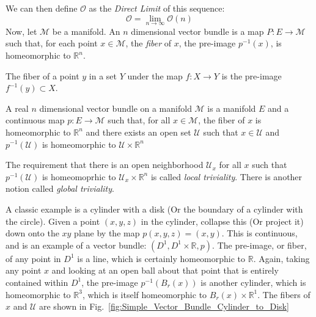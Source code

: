 \documentclass[crop=false,class=book,oneside]{standalone}                      %
\begin{document}
            We can then define $\mathcal{O}$ as the
            \textit{Direct Limit} of this sequence:
            \begin{equation*}
                \mathcal{O}=\underset{n\rightarrow\infty}{\lim}\mathcal{O}(n)
            \end{equation*}
            Now, let $\mathcal{M}$ be a manifold. An $n$ dimensional vector
            bundle is a map $P:E\rightarrow\mathcal{M}$ such that, for each
            point $x\in\mathcal{M}$, the \textit{fiber} of $x$, the pre-image
            $p^{-1}(x)$, is homeomorphic to $\mathbb{R}^{n}$.
            \begin{definition}
                The fiber of a point $y$ in a set $Y$ under the map
                $f:X\rightarrow{Y}$ is the pre-image $f^{-1}(y)\subset{X}$.
            \end{definition}
            \begin{definition}
                A real $n$ dimensional vector bundle on a manifold $\mathcal{M}$
                is a manifold $E$ and a continuous map
                $p:E\rightarrow\mathcal{M}$ such that, for all
                $x\in\mathcal{M}$, the fiber of $x$ is homeomorphic to
                $\mathbb{R}^{n}$ and there exists an open set $\mathcal{U}$
                such that $x\in\mathcal{U}$ and $p^{-1}(\mathcal{U})$ is
                homeomorphic to $\mathcal{U}\times\mathbb{R}^{n}$
            \end{definition}
            The requirement that there is an open neighborhood $\mathcal{U}_{x}$
            for all $x$ such that $p^{-1}(\mathcal{U})$ is homeomoprhic to
            $\mathcal{U}_{x}\times\mathbb{R}^{n}$ is called
            \textit{local triviality}. There is another notion called
            \textit{global triviality}.
            \begin{example}
                A classic example is a cylinder with a disk (Or the boundary of
                a cylinder with the circle). Given a point $(x,y,z)$ in the
                cylinder, collapse this (Or project it) down onto the $xy$
                plane by the map $p(x,y,z)=(x,y)$. This is continuous, and is
                an example of a vector bundle:
                $(D^{1},D^{1}\times\mathbb{R},p)$. The pre-image, or fiber, of
                any point in $D^{1}$ is a line, which is certainly homeomorphic
                to $\mathbb{R}$. Again, taking any point $x$ and looking at an
                open ball about that point that is entirely contained within
                $D^{1}$, the pre-image $p^{-1}(B_{r}(x))$ is another cylinder,
                which is homeomorphic to $\mathbb{R}^{3}$, which is itself
                homeomorphic to $B_{r}(x)\times\mathbb{R}^{1}$. The fibers of
                $x$ and $\mathcal{U}$ are shown in
                Fig.~\ref{fig:Simple_Vector_Bundle_Cylinder_to_Disk}
            \end{example}
\end{document}
